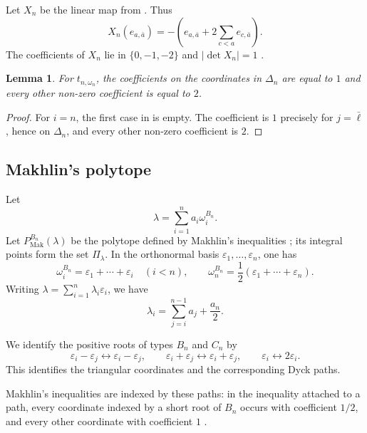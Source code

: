 \documentclass[a4paper, 12pt]{amsart}
\newtheorem{lemma}[theorem]{Lemma}
\newcommand{\Mak}{\mathrm{Mak}}
\newcommand{\eps}{\varepsilon}
\begin{document}
Let $X_n$ be the linear map from
\cite[Definition~4.1]{CFL24}. Thus
\begin{equation}\label{eq:Xdiag}
 X_n(e_{a,\bar a})
  =-\left(e_{a,\bar a}+2\sum_{c<a}e_{c,\bar a}\right).
\end{equation}
The coefficients of $X_n$ lie in $\{0,-1,-2\}$ and
$|\det X_n|=1$ \cite[Proposition~4.4]{CFL24}.

\begin{lemma}\label{lem:translation}
For $t_{n,\omega_n}$, the coefficients on the coordinates in $\Delta_n$ are equal to $1$ and every other non-zero coefficient is equal to $2$.
\end{lemma}

\begin{proof}
For $i=n$, the first case in \cite[Definition~4.5]{CFL24} is empty.
The coefficient is $1$ precisely for $j=\bar\ell$, hence on $\Delta_n$,
and every other non-zero coefficient is $2$.
\end{proof}

\subsection{Makhlin's polytope}

Let
\[
                  \lambda=\sum_{i=1}^n a_i\omega_i^{B_n}.
\]
Let \(P_{\Mak}^{B_n}(\lambda)\) be the polytope defined by Makhlin's inequalities \cite[Section~1 and Remark~2.3]{Mak19}; its integral points form the set \(\Pi_\lambda\). In the orthonormal basis $\eps_1,\ldots,\eps_n$, one has
\[
 \omega_i^{B_n}=\eps_1+\cdots+\eps_i\quad(i<n),
 \qquad
 \omega_n^{B_n}=\frac12(\eps_1+\cdots+\eps_n).
\]
Writing $\lambda=\sum_{i=1}^n\lambda_i\eps_i$, we have
\begin{equation}\label{eq:lambdaeps}
             \lambda_i=\sum_{j=i}^{n-1}a_j+\frac{a_n}{2}.
\end{equation}

We identify the positive roots of types $B_n$ and $C_n$ by
\[
 \eps_i-\eps_j\longleftrightarrow\eps_i-\eps_j,\qquad
 \eps_i+\eps_j\longleftrightarrow\eps_i+\eps_j,\qquad
 \eps_i\longleftrightarrow2\eps_i.
\]
This identifies the triangular coordinates and the corresponding Dyck paths.

Makhlin's inequalities are indexed by these paths: in the inequality attached to a path, every coordinate indexed by a short root of $B_n$ occurs with coefficient $1/2$, and every other coordinate with coefficient $1$ \cite[Section~1]{Mak19}.
\end{document}
